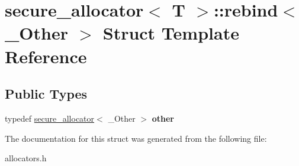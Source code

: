 \hypertarget{structsecure__allocator_1_1rebind}{}\section{secure\+\_\+allocator$<$ T $>$\+::rebind$<$ \+\_\+\+Other $>$ Struct Template Reference}
\label{structsecure__allocator_1_1rebind}
\subsection*{Public Types}
\begin{DoxyCompactItemize}
\item 
\mbox{\label{structsecure__allocator_1_1rebind_aa0688d32e40d8ae116efec5946f1a3b5}} 
typedef \mbox{\hyperlink{structsecure__allocator}{secure\+\_\+allocator}}$<$ \+\_\+\+Other $>$ {\bfseries other}
\end{DoxyCompactItemize}


The documentation for this struct was generated from the following file\+:\begin{DoxyCompactItemize}
\item 
allocators.\+h\end{DoxyCompactItemize}
